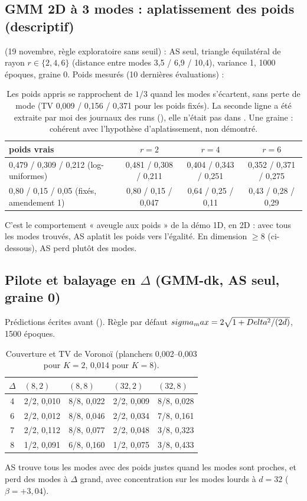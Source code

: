 \subsection{GMM 2D à 3 modes : aplatissement des poids (descriptif)}
 (19 novembre, règle exploratoire sans seuil) : AS seul, triangle équilatéral de rayon $r\in\{2,4,6\}$ (distance entre modes 3,5 / 6,9 / 10,4), variance 1, 1000 époques, graine 0. Poids mesurés (10 dernières évaluations) :
\begin{table}[h]\centering\footnotesize
\begin{tabular}{lccc}\toprule
poids vrais & $r=2$ & $r=4$ & $r=6$\\\midrule
0,479 / 0,309 / 0,212 (log-uniformes) & 0,481 / 0,308 / 0,211 & 0,404 / 0,343 / 0,251 & 0,352 / 0,371 / 0,275\\
0,80 / 0,15 / 0,05 (fixés, amendement 1) & 0,80 / 0,15 / 0,047 & 0,64 / 0,25 / 0,11 & 0,43 / 0,28 / 0,29\\\bottomrule
\end{tabular}
\caption{Les poids appris se rapprochent de $1/3$ quand les modes s'écartent, sans perte de mode (TV 0,009 / 0,156 / 0,371 pour les poids fixés). La seconde ligne a été extraite par moi des journaux des runs (), elle n'était pas dans . Une graine : cohérent avec l'hypothèse d'aplatissement, non démontré.}
\end{table}
C'est le comportement « aveugle aux poids » de la démo 1D, en 2D : avec tous les modes trouvés, AS aplatit les poids vers l'égalité. En dimension $\ge8$ (ci-dessous), AS perd plutôt des modes.

\subsection{Pilote et balayage en $\Delta$ (GMM-dk, AS seul, graine 0)}
Prédictions écrites avant (). Règle par défaut $sigma_max=2\sqrt{1+Delta^2/(2d)}$, 1500 époques.
\begin{table}[h]\centering\small
\begin{tabular}{cllll}\toprule
$\Delta$ & $(8,2)$ & $(8,8)$ & $(32,2)$ & $(32,8)$\\\midrule
4 & 2/2, 0,010 & 8/8, 0,022 & 2/2, 0,009 & 8/8, 0,028\\
6 & 2/2, 0,012 & 8/8, 0,046 & 2/2, 0,034 & 7/8, 0,161\\
7 & 2/2, 0,112 & 8/8, 0,077 & 2/2, 0,048 & 3/8, 0,323\\
8 & 1/2, 0,091 & 6/8, 0,160 & 1/2, 0,075 & 3/8, 0,433\\\bottomrule
\end{tabular}
\caption{Couverture et TV de Voronoï (planchers 0,002--0,003 pour $K=2$, 0,014 pour $K=8$).}
\end{table}
AS trouve tous les modes avec des poids justes quand les modes sont proches, et perd des modes à $\Delta$ grand, avec concentration sur les modes lourds à $d=32$ ($\beta=+3{,}04$).

